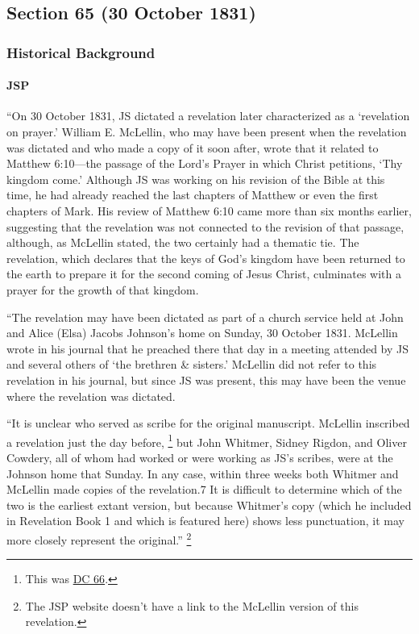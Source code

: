 \subsection{Section 65 (30 October 1831)}
	\label{DC65}
	
	\subsubsection{Historical Background}
		\label{DC65-HB}
		
		\paragraph{JSP}
		
			``On 30 October 1831, JS dictated a revelation later characterized as a `revelation on prayer.' William E. McLellin, who may have been present when the revelation was dictated and who made a copy of it soon after, wrote that it related to Matthew 6:10---the passage of the Lord's Prayer in which Christ petitions, `Thy kingdom come.' Although JS was working on his revision of the Bible at this time, he had already reached the last chapters of Matthew or even the first chapters of Mark. His review of Matthew 6:10 came more than six months earlier, suggesting that the revelation was not connected to the revision of that passage, although, as McLellin stated, the two certainly had a thematic tie. The revelation, which declares that the keys of God's kingdom have been returned to the earth to prepare it for the second coming of Jesus Christ, culminates with a prayer for the growth of that kingdom.
			
			``The revelation may have been dictated as part of a church service held at John and Alice (Elsa) Jacobs Johnson's home on Sunday, 30 October 1831. McLellin wrote in his journal that he preached there that day in a meeting attended by JS and several others of `the brethren \& sisters.' McLellin did not refer to this revelation in his journal, but since JS was present, this may have been the venue where the revelation was dictated.
			
			``It is unclear who served as scribe for the original manuscript. McLellin inscribed a revelation just the day before,%
				\footnote{%
					This was \hyperref[DC66]{DC 66}.
					}
			but John Whitmer, Sidney Rigdon, and Oliver Cowdery, all of whom had worked or were working as JS's scribes, were at the Johnson home that Sunday. In any case, within three weeks both Whitmer and McLellin made copies of the revelation.7 It is difficult to determine which of the two is the earliest extant version, but because Whitmer's copy (which he included in Revelation Book 1 and which is featured here) shows less punctuation, it may more closely represent the original.''%
				\footnote{%
					The JSP website doesn't have a link to the McLellin version of this revelation.
					}
		
